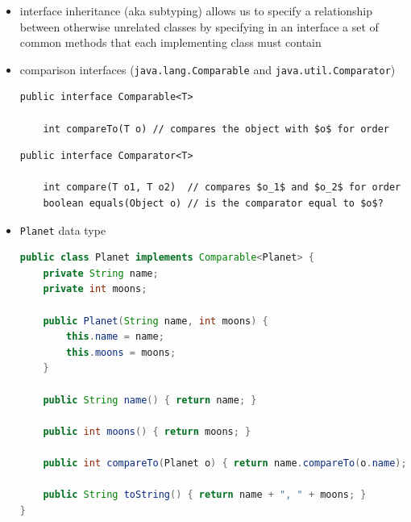 \documentclass[8pt,a4paper,compress]{beamer}
\begin{document}
\begin{frame}[fragile]
\begin{itemize}
\item interface inheritance (aka subtyping) allows us to specify a relationship between otherwise unrelated classes by specifying in
an interface a set of common methods that each implementing class must contain

\item comparison interfaces (\lstinline{java.lang.Comparable} and \lstinline{java.util.Comparator})
\begin{lstlisting}[language={},mathescape]
public interface Comparable<T>

    int compareTo(T o) // compares the object with $o$ for order
\end{lstlisting}

\begin{lstlisting}[language={},mathescape]
public interface Comparator<T>

    int compare(T o1, T o2)  // compares $o_1$ and $o_2$ for order
    boolean equals(Object o) // is the comparator equal to $o$? 
\end{lstlisting}

\item \lstinline{Planet} data type
\begin{lstlisting}[language=Java]
public class Planet implements Comparable<Planet> {
    private String name;
    private int moons;

    public Planet(String name, int moons) {
        this.name = name;
        this.moons = moons;
    }
    
    public String name() { return name; }

    public int moons() { return moons; }

    public int compareTo(Planet o) { return name.compareTo(o.name); }
    
    public String toString() { return name + ", " + moons; }
}
\end{lstlisting}
\end{itemize}
\end{frame}
\end{document}
